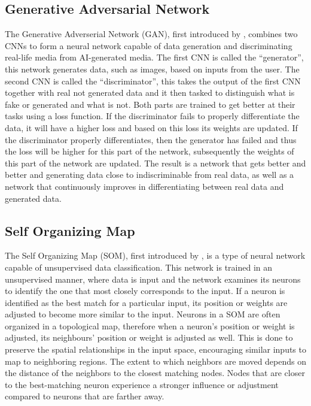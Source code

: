 \documentclass[conference]{IEEEtran}
\begin{document}
\subsection{Generative Adversarial Network} \label{GAN}
The Generative Adverserial Network (GAN), first introduced by \cite{goodfellow2014generative}, combines two CNNs to form a neural network capable of data generation and discriminating real-life media from AI-generated media. The first CNN is called the ``generator'', this network generates data, such as images, based on inputs from the user. The second CNN is called the ``discriminator'', this takes the output of the first CNN together with real not generated data and it then tasked to distinguish what is fake or generated and what is not. Both parts are trained to get better at their tasks using a loss function. If the discriminator fails to properly differentiate the data, it will have a higher loss and based on this loss its weights are updated. If the discriminator properly differentiates, then the generator has failed and thus the loss will be higher for this part of the network, subsequently the weights of this part of the network are updated. The result is a network that gets better and better and generating data close to indiscriminable from real data, as well as a network that continuously improves in differentiating between real data and generated data.

\subsection{Self Organizing Map} \label{SOM}
The Self Organizing Map (SOM), first introduced by \cite{kohonen1982self}, is a type of neural network capable of unsupervised data classification. This network is trained in an unsupervised manner, where data is input and the network examines its neurons to identify the one that most closely corresponds to the input. If a neuron is identified as the best match for a particular input, its position or weights are adjusted to become more similar to the input. Neurons in a SOM are often organized in a topological map, therefore when a neuron's position or weight is adjusted, its neighbours' position or weight is adjusted as well. This is done to preserve the spatial relationships in the input space, encouraging similar inputs to map to neighboring regions. The extent to which neighbors are moved depends on the distance of the neighbors to the closest matching nodes. Nodes that are closer to the best-matching neuron experience a stronger influence or adjustment compared to neurons that are farther away.
\end{document}
